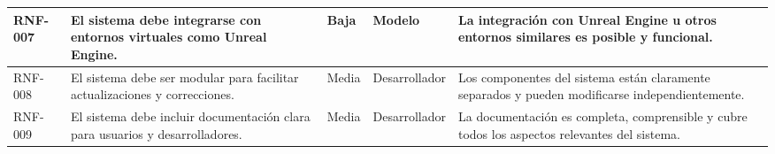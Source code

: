 \begin{table}[H]
\begin{adjustbox}{width=\textwidth}
\begin{tabular}{p{1.2cm}p{5cm}p{1.75cm}p{2.25cm}p{5cm}}
    \hline %
    RNF-007 & El sistema debe integrarse con entornos virtuales como Unreal Engine. & Baja & Modelo & La integración con Unreal Engine u otros entornos similares es posible y funcional. \\
    \hline %
    RNF-008 & El sistema debe ser modular para facilitar actualizaciones y correcciones. & Media & Desarrollador & Los componentes del sistema están claramente separados y pueden modificarse independientemente. \\
    \hline %
    RNF-009 & El sistema debe incluir documentación clara para usuarios y desarrolladores. & Media & Desarrollador & La documentación es completa, comprensible y cubre todos los aspectos relevantes del sistema. \\
    \hline %
    \end{tabular}
    \end{adjustbox}
\end{table}
\vspace{0.2cm}